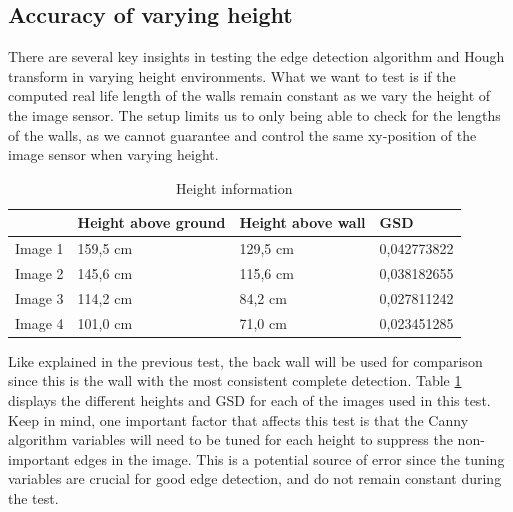 \subsection{Accuracy of varying height}
\label{varyingheight}
There are several key insights in testing the edge detection algorithm and Hough transform in varying height environments. What we want to test is if the computed real life length of the walls remain constant as we vary the height of the image sensor. The setup limits us to only being able to check for the lengths of the walls, as we cannot guarantee and control the same xy-position of the image sensor when varying height.
\begin{table}[H]
\centering
\begin{tabular}{l|l|l|l|}
\cline{2-4}
                              & Height above ground & Height above wall & GSD\\ \hline
\multicolumn{1}{|l|}{Image 1} & 159,5 cm            & 129,5 cm          & 0,042773822\\ \hline
\multicolumn{1}{|l|}{Image 2} & 145,6 cm            & 115,6 cm          & 0,038182655\\ \hline
\multicolumn{1}{|l|}{Image 3} & 114,2 cm            & 84,2 cm           & 0,027811242\\ \hline
\multicolumn{1}{|l|}{Image 4} & 101,0 cm            & 71,0 cm           & 0,023451285\\ \hline
\end{tabular}
\caption{Height information}
\label{height}
\end{table}
Like explained in the previous test, the back wall will be used for comparison since this is the wall with the most consistent complete detection. Table \ref{height} displays the different heights and GSD for each of the images used in this test. Keep in mind, one important factor that affects this test is that the Canny algorithm variables will need to be tuned for each height to suppress the non-important edges in the image. This is a potential source of error since the tuning variables are crucial for good edge detection, and do not remain constant during the test.


